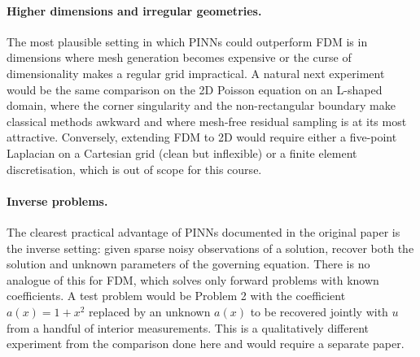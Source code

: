\documentclass[11pt]{article}
\theoremstyle{plain}
\theoremstyle{remark}
\begin{document}
\paragraph{Higher dimensions and irregular geometries.} The most
plausible setting in which PINNs could outperform FDM is in dimensions
where mesh generation becomes expensive or the curse of dimensionality
makes a regular grid impractical. A natural next experiment would be
the same comparison on the 2D Poisson equation on an L-shaped domain,
where the corner singularity and the non-rectangular boundary make
classical methods awkward and where mesh-free residual sampling is at
its most attractive. Conversely, extending FDM to 2D would require
either a five-point Laplacian on a Cartesian grid (clean but inflexible)
or a finite element discretisation, which is out of scope for this
course.

\paragraph{Inverse problems.} The clearest practical advantage of
PINNs documented in the original \citet{raissi2019} paper is the inverse
setting: given sparse noisy observations of a solution, recover both
the solution and unknown parameters of the governing equation. There is
no analogue of this for FDM, which solves only forward problems with
known coefficients. A test problem would be Problem 2 with the
coefficient $a(x) = 1 + x^2$ replaced by an unknown $a(x)$ to be
recovered jointly with $u$ from a handful of interior measurements.
This is a qualitatively different experiment from the comparison done
here and would require a separate paper.




\end{document}
